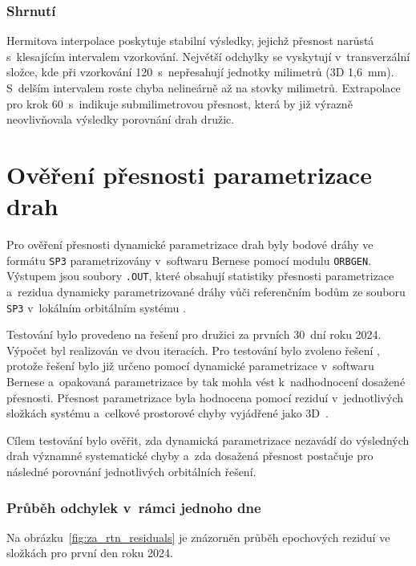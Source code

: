 \subsubsection{Shrnutí}

Hermitova interpolace poskytuje stabilní výsledky, jejichž přesnost narůstá s~klesajícím intervalem vzorkování. Největší odchylky se vyskytují v~transverzální složce, kde při vzorkování 120~s~nepřesahují jednotky milimetrů (3D  1{,}6~mm). S~delším intervalem roste chyba nelineárně až na stovky milimetrů. Extrapolace pro krok 60~s~indikuje submilimetrovou přesnost, která by již výrazně neovlivňovala výsledky porovnání drah družic.

\section{Ověření přesnosti parametrizace drah}

Pro ověření přesnosti dynamické parametrizace drah byly bodové dráhy ve formátu \texttt{SP3} parametrizovány v~softwaru Bernese pomocí modulu \texttt{ORBGEN}. Výstupem jsou soubory \texttt{.OUT}, které obsahují statistiky přesnosti parametrizace a~rezidua dynamicky parametrizované dráhy vůči referenčním bodům ze souboru \texttt{SP3} v~lokálním orbitálním systému .

Testování bylo provedeno na řešení  pro družici  za prvních 30~dní roku 2024. Výpočet byl realizován ve dvou iteracích. Pro testování bylo zvoleno řešení , protože řešení  bylo již určeno pomocí dynamické parametrizace v~softwaru Bernese a~opakovaná parametrizace by tak mohla vést k~nadhodnocení dosažené přesnosti. Přesnost parametrizace byla hodnocena pomocí  reziduí v~jednotlivých složkách systému  a~celkové prostorové chyby vyjádřené jako 3D~.

Cílem testování bylo ověřit, zda dynamická parametrizace nezavádí do výsledných drah významné systematické chyby a~zda dosažená přesnost postačuje pro následné porovnání jednotlivých orbitálních řešení.

\subsubsection{Průběh odchylek v~rámci jednoho dne}

Na obrázku~\ref{fig:za_rtn_residuals} je znázorněn průběh epochových reziduí ve složkách
 pro první den roku 2024.

